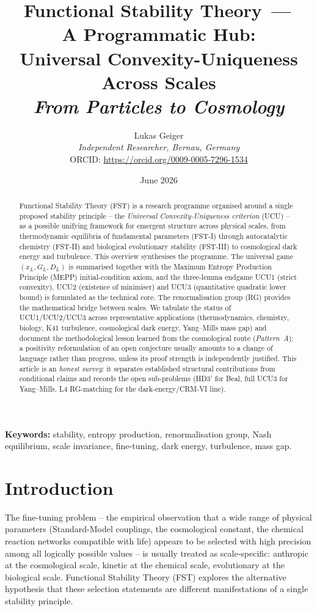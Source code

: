 \documentclass[11pt,a4paper]{article}
\title{Functional Stability Theory \,---\,\\
A Programmatic Hub:\\
Universal Convexity-Uniqueness\\
Across Scales\\[0.5em]
\large\textit{From Particles to Cosmology}}
\author{Lukas Geiger\\
\textit{Independent Researcher, Bernau, Germany}\\
ORCID: \url{https://orcid.org/0009-0005-7296-1534}}
\date{June 2026}
\theoremstyle{remark}
\begin{document}
\maketitle

\begin{abstract}
\noindent
Functional Stability Theory (FST) is a research programme organised
around a single proposed stability principle -- the \emph{Universal
Convexity-Uniqueness criterion} (UCU) -- as a possible unifying
framework for emergent structure across physical scales, from
thermodynamic equilibria of fundamental parameters (FST-I) through
autocatalytic chemistry (FST-II) and biological evolutionary stability
(FST-III) to cosmological dark energy and turbulence. This overview
synthesises the programme. The
universal game $(x_L, G_L, D_L)$ is summarised together with the
Maximum Entropy Production Principle (MEPP) initial-condition axiom,
and the three-lemma endgame UCU1 (strict convexity), UCU2 (existence
of minimiser) and UCU3 (quantitative quadratic lower bound) is
formulated as the technical core. The renormalisation group (RG)
provides the mathematical bridge between scales. We tabulate the
status of UCU1/UCU2/UCU3 across representative applications
(thermodynamics,
chemistry, biology, K41 turbulence, cosmological dark energy,
Yang--Mills mass gap) and document the methodological lesson learned
from the cosmological route (\emph{Pattern~A}): a positivity
reformulation of an open conjecture usually amounts to a change of
language rather than progress, unless its proof strength is
independently justified. This article is an \emph{honest survey}: it
separates established structural contributions from conditional
claims and records the open sub-problems (HD3' for Beal, full UCU3
for Yang--Mills, L4 RG-matching for the dark-energy/CRM-VI line).
\end{abstract}

\textbf{Keywords:} stability, entropy production, renormalisation group,
Nash equilibrium, scale invariance, fine-tuning, dark energy,
turbulence, mass gap.

\clearpage

\section{Introduction}
\label{sec:intro}

The fine-tuning problem -- the empirical observation that a wide range
of physical parameters (Standard-Model couplings, the cosmological
constant, the chemical reaction networks compatible with life) appears
to be selected with high precision among all logically possible values
-- is usually treated as scale-specific: anthropic at the cosmological
scale, kinetic at the chemical scale, evolutionary at the biological
scale. Functional Stability Theory (FST) explores the alternative
hypothesis that these selection statements are different manifestations
of a single stability principle.
\end{document}
